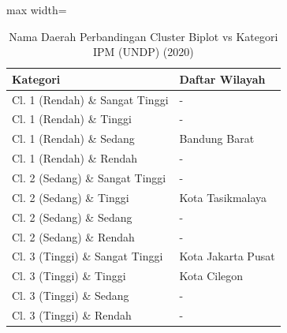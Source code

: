 \begin{table}[H]
\centering
\caption{Nama Daerah Perbandingan Cluster Biplot vs Kategori IPM (UNDP) (2020)} \label{tab:samplecrossname2020}
\begin{adjustbox}{max width=\textwidth}
\begin{tabular}{|p{4cm}|p{10cm}|}
\hline
\textbf{Kategori} & \textbf{Daftar Wilayah} \\
\hline
Cl. 1 (Rendah) \& Sangat Tinggi & - \\
\hline
Cl. 1 (Rendah) \& Tinggi & - \\
\hline
Cl. 1 (Rendah) \& Sedang & Bandung Barat \\
\hline
Cl. 1 (Rendah) \& Rendah & - \\
\hline
Cl. 2 (Sedang) \& Sangat Tinggi & - \\
\hline
Cl. 2 (Sedang) \& Tinggi & Kota Tasikmalaya \\
\hline
Cl. 2 (Sedang) \& Sedang & - \\
\hline
Cl. 2 (Sedang) \& Rendah & - \\
\hline
Cl. 3 (Tinggi) \& Sangat Tinggi & Kota Jakarta Pusat \\
\hline
Cl. 3 (Tinggi) \& Tinggi & Kota Cilegon \\
\hline
Cl. 3 (Tinggi) \& Sedang & - \\
\hline
Cl. 3 (Tinggi) \& Rendah & - \\
\hline
\end{tabular}
\end{adjustbox}
\end{table}